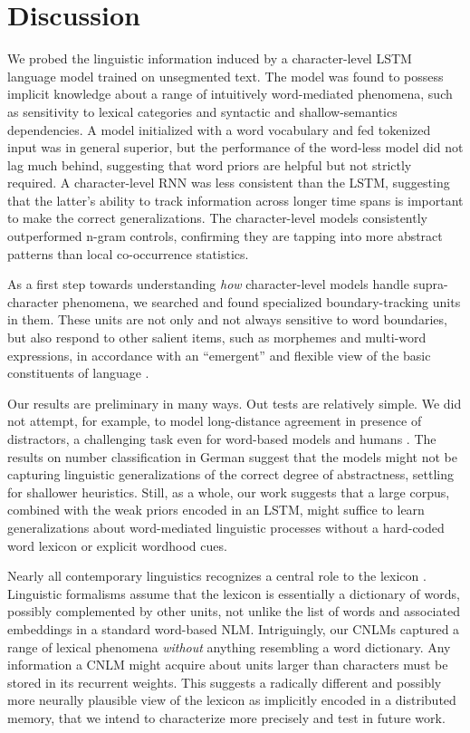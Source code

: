 \section{Discussion}
\label{sec:discussion}

We probed the linguistic information induced by a character-level LSTM
language model trained on unsegmented text. The model was found to
possess implicit knowledge about a range of intuitively word-mediated
phenomena, such as sensitivity to lexical categories and syntactic and
shallow-semantics dependencies. A model initialized with a word
vocabulary and fed tokenized input was in general superior, but the
performance of the word-less model did not lag much behind, suggesting
that word priors are helpful but not strictly required. A
character-level RNN was less consistent than the LSTM, suggesting that
the latter's ability to track information across longer time spans is
important to make the correct generalizations. The character-level
models consistently outperformed n-gram controls, confirming they are
tapping into more abstract patterns than local co-occurrence
statistics.

As a first step towards understanding \emph{how} character-level
models handle supra-character phenomena, we searched and found
specialized boundary-tracking units in them. These units are not only
and not always sensitive to word boundaries, but also respond to other
salient items, such as morphemes and multi-word expressions, in
accordance with an ``emergent'' and flexible view of the basic
constituents of language \cite{Schiering:etal:2010}.

Our results are preliminary in many ways. Out tests are relatively
simple. We did not attempt, for example, to model long-distance
agreement in presence of distractors, a challenging task even for
word-based models and humans \citep{Gulordava:etal:2018}. The results
on number classification in German suggest that the models might not
be capturing linguistic generalizations of the correct degree of
abstractness, settling for shallower heuristics. Still, as a whole,
our work suggests that a large corpus, combined with the weak priors
encoded in an LSTM, might suffice to learn generalizations about
word-mediated linguistic processes without a hard-coded word lexicon
or explicit wordhood cues.

Nearly all contemporary linguistics recognizes a central role to the
lexicon \cite[see, e.g.,][for very different
perspectives]{Sag:etal:2003,Goldberg:2005,Radford:2006,Bresnan:etal:2016,Jezek:2016}. Linguistic
formalisms assume that the lexicon is essentially a dictionary of
words, possibly complemented by other units, not unlike the list of
words and associated embeddings in a standard word-based
NLM. Intriguingly, our CNLMs captured a range of lexical phenomena
\emph{without} anything resembling a word dictionary. Any information
a CNLM might acquire about units larger than characters must be stored
in its recurrent weights. This suggests a radically different and
possibly more neurally plausible view of the lexicon as
implicitly encoded in a distributed memory, that we intend to
characterize more precisely and test in future work.

